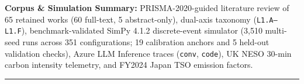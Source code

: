 \documentclass[11pt,letterpaper]{article}
\begin{document}
\par\vspace{14pt}
\noindent\textbf{Corpus \& Simulation Summary:} PRISMA-2020-guided literature review of 65 retained works (60 full-text, 5 abstract-only), dual-axis taxonomy (\texttt{L1.A--L1.F}), benchmark-validated SimPy 4.1.2 discrete-event simulator (3,510 multi-seed runs across 351 configurations; 19 calibration anchors and 5 held-out validation checks), Azure LLM Inference traces (\texttt{conv}, \texttt{code}), UK NESO 30-min carbon intensity telemetry, and FY2024 Japan TSO emission factors.

\par\vspace{18pt}
\noindent\rule{\textwidth}{0.5pt}
\par\vspace{8pt}
\end{document}
